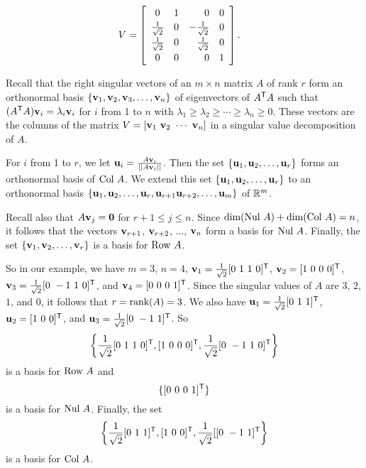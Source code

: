 \begin{example}
\begin{align*}
V &= \left[\renewcommand{\arraystretch}{1.2} \begin{array}{ccrc} 0&1&0&0 \\ \frac{1}{\sqrt{2}}&0&-\frac{1}{\sqrt{2}}&0 \\ \frac{1}{\sqrt{2}}&0&\frac{1}{\sqrt{2}}&0 \\ 0&0&0&1 \end{array} \right].
\end{align*}

\item Recall that the right singular vectors of an $m \times n$ matrix $A$ of rank $r$ form an orthonormal basis $\{\mathbf{v}_1, \mathbf{v}_2, \mathbf{v}_3, \ldots, \mathbf{v}_n\}$ of eigenvectors of $A^{\mathsf{T}}A$ such that $(A^{\mathsf{T}}A) \mathbf{v}_i = \lambda_i \mathbf{v}_i$ for $i$ from 1 to $n$ with $\lambda_1 \geq \lambda_{2} \geq \cdots \geq \lambda_n \geq 0$. These vectors are the columns of the matrix $V = [\mathbf{v}_1 \ \mathbf{v}_2 \ \cdots \ \mathbf{v}_n]$ in a singular value decomposition of $A$. 

For $i$ from 1 to $r$, we let $\mathbf{u}_i = \frac{A\mathbf{v}_i}{||A\mathbf{v}_i||}$. Then the set $\{\mathbf{u}_1, \mathbf{u}_2, \ldots, \mathbf{u}_r\}$ forms an orthonormal basis of $\text{Col } A$. We extend this set $\{\mathbf{u}_1, \mathbf{u}_2, \ldots, \mathbf{u}_r\}$ to an orthonormal basis $\{\mathbf{u}_1, \mathbf{u}_2, \ldots, \mathbf{u}_r, \mathbf{u}_{r+1} \mathbf{u}_{r+2}, \ldots, \mathbf{u}_m\}$ of $\mathbb{R}^m$.

Recall also that $A \mathbf{v}_j = \mathbf{0}$ for $r+1 \leq j \leq n$. Since $\dim(\text{Nul } A) + \dim(\text{Col } A) = n$, it follows that the vectors $\mathbf{v}_{r+1}$, $\mathbf{v}_{r+2}$, $\ldots$, $\mathbf{v}_n$ form a basis for $\text{Nul } A$.  Finally, the set $\{\mathbf{v}_1, \mathbf{v}_2, \ldots, \mathbf{v}_r\}$ is a basis for $\text{Row } A$. 

So in our example, we have $m = 3$, $n = 4$, $\vv_1 = \frac{1}{\sqrt{2}}[0 \ 1 \ 1 \ 0]^{\tr}$, $\vv_2 = [1 \ 0 \ 0 \ 0]^{\tr}$, $\mathbf{v}_3 = \frac{1}{\sqrt{2}}[0 \ -1 \ 1 \ 0]^{\mathsf{T}}$, and $\mathbf{v}_4 = [0 \ 0 \ 0 \ 1]^{\mathsf{T}}$. Since the singular values of $A$ are $3$, $2$, $1$, and $0$, it follows that $r = \text{rank}(A) = 3$. We also have $\vu_1 = \frac{1}{\sqrt{2}}[0 \ 1 \ 1]^{\tr}$, $\vu_2 = [1 \ 0 \ 0]^{\tr}$, and $\mathbf{u}_3 = \frac{1}{\sqrt{2}}[ 0 \ -1 \ 1]^{\mathsf{T}}$. So 
\[\left\{\frac{1}{\sqrt{2}}[0 \ 1 \ 1 \ 0]^{\tr}, [1 \ 0 \ 0 \ 0]^{\tr}, \frac{1}{\sqrt{2}}[0 \ -1 \ 1 \ 0]^{\tr}\right\}\]
is a basis for $\text{Row } A$ and
\[\{[0 \ 0 \ 0 \ 1]^{\tr}\}\]
is a basis for $\text{Nul } A$. Finally, the set 
\[ \left\{ \frac{1}{\sqrt{2}}[0 \ 1 \ 1]^{\mathsf{T}}, [1 \ 0 \ 0]^{\mathsf{T}}, \frac{1}{\sqrt{2}}[[ 0 \ -1 \ 1]^{\mathsf{T}}\right\}\]
is a basis for $\text{Col } A$. 

\ea


\end{example} 


